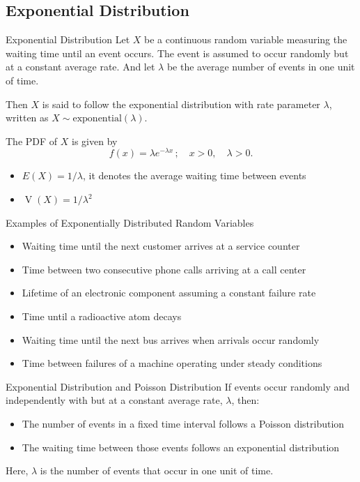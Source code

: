 \documentclass[12pt, aspectratio=169]{beamer}
\DeclareMathOperator{\V}{V}
\begin{document}
	\subsection{Exponential Distribution}

	\begin{frame}{Exponential Distribution}
		Let \(X\) be a continuous random variable measuring the waiting time until an event occurs. The event is assumed to occur randomly but at a constant average rate. And let \(\lambda\) be the average number of events in one unit of time.

		\vspace{0.5em}

		Then \(X\) is said to follow the exponential distribution with rate parameter \(\lambda\), written as \(X \sim \mathrm{exponential}(\lambda)\).

		\vspace{0.5em}

		The PDF of \(X\) is given by 
		\[
			f(x) = \lambda e^{-\lambda x} \,; \quad x> 0, \quad \lambda > 0.
		\]

		\begin{itemize}
			\item \(E(X) = 1/\lambda\), it denotes the average waiting time between events
			\item \(\V(X) = 1/\lambda^2\)
		\end{itemize}
	\end{frame}


	\begin{frame}{Examples of Exponentially Distributed Random Variables}
		\begin{itemize}
			\item Waiting time until the next customer arrives at a service counter
			\item Time between two consecutive phone calls arriving at a call center
			\item Lifetime of an electronic component assuming a constant failure rate
			\item Time until a radioactive atom decays
			\item Waiting time until the next bus arrives when arrivals occur randomly
			\item Time between failures of a machine operating under steady conditions
		\end{itemize}		
	\end{frame}


	\begin{frame}{Exponential Distribution and Poisson Distribution}
		If events occur randomly and independently with but at a constant average rate, \(\lambda\), then:

		\begin{itemize}
			\item The number of events in a fixed time interval follows a Poisson distribution
			\item The waiting time between those events follows an exponential distribution
		\end{itemize}
		
		Here, \(\lambda\) is the number of events that occur in one unit of time.
	\end{frame}
\end{document}
